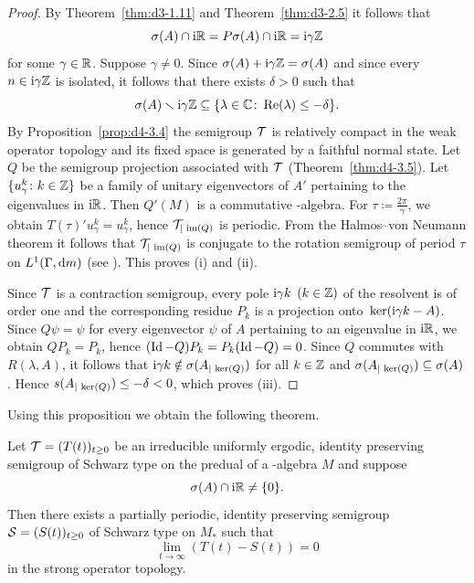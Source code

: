 \begin{proof}
By Theorem~\ref{thm:d3-1.11} and Theorem~\ref{thm:d3-2.5} it follows that
\[
\sigma(A) \cap \mathrm{i}\mathbb{R} = P\sigma(A) \cap \mathrm{i}\mathbb{R} = \mathrm{i}\gamma\mathbb{Z}
\]
for some $ \gamma \in \mathbb{R} $.
Suppose $ \gamma \neq 0 $.
Since $ \sigma(A) + \mathrm{i}\gamma\mathbb{Z} = \sigma(A) $  and since every $ n \in \mathrm{i}\gamma\mathbb{Z} $  is isolated, it follows that there exists $ \delta > 0 $  such that
\[
\sigma(A) \setminus \im\gamma\Z \subseteq \{\lambda \in \C \colon  \Re(\lambda) \leq -\delta\}.
\]
By Proposition~\ref{prop:d4-3.4} the semigroup $ \mathcal{T} $  is relatively compact in the weak operator topology and its fixed space is generated by a faithful normal state.
Let $ Q $  be the semigroup projection associated with $ \mathcal{T} $  (Theorem~\ref{thm:d4-3.5}).
Let $ \{u_{\gamma}^{k} \colon k \in \mathbb{Z}\} $  be a family of unitary eigenvectors of\/ $ A' $  pertaining to the eigenvalues in $ \mathrm{i}\mathbb{R} $.
Then $ Q'(M) $  is a commutative \WA-algebra.
For $ \tau \coloneqq \frac{2\pi}{\gamma} $, we obtain $ T(\tau)'u_{\gamma}^{k} = u_{\gamma}^{k} $, hence $ \mathcal{T}_{\vert \mathop{}\mathrm{im}(Q)} $  is periodic.
From the Halmos--von Neumann theorem it follows that $ \mathcal{T}_{\vert \mathop{}\mathrm{im}(Q)} $  is conjugate to the rotation semigroup of period $ \tau $  on $ L^{1}(\Gamma, \mathop{}\!\mathrm{d}{m}) $ (see \textcite[Theorem III.7.11]{schaefer:1974}).
This proves (i) and (ii).

Since $ \mathcal{T} $  is a contraction semigroup, every pole $ \mathrm{i}\gamma k $  $ (k \in \mathbb{Z}) $  of the resolvent is of order one and the corresponding residue $ P_{k} $  is a projection onto $ \mathop{}\mathrm{ker}(\mathrm{i}\gamma k - A) $.
Since $ Q\psi = \psi $  for every eigenvector $ \psi $  of\/ $ A $  pertaining to an eigenvalue in $ \mathrm{i}\mathbb{R} $, we obtain $ QP_{k} = P_{k} $, hence $ (\operatorname{Id} - Q)P_{k} = P_{k}(\operatorname{Id} - Q) = 0 $.
Since $ Q $  commutes with $ R(\lambda,A) $, it follows that $ \mathrm{i}\gamma k \notin \sigma(A_{\vert \mathop{}\mathrm{ker}(Q)}) $  for all $ k \in \mathbb{Z} $  and $ \sigma(A_{\vert \mathop{}\mathrm{ker}(Q)}) \subseteq \sigma(A) $.
Hence $ s(A_{\vert \Kern{Q}}) \leq -\delta < 0 $, which proves (iii).
\end{proof}
Using this proposition we obtain the following theorem.
\begin{theorem}\label{thm:d4-3.11}
Let $ \TT = (T(t))_{t \geq 0} $  be an irreducible uniformly ergodic, identity preserving semigroup of Schwarz type on the predual of a \WA-algebra $ M $  and suppose 
%
\[
	\sigma(A) \cap \mathrm{i}\mathbb{R} \neq \{0\} .
\]
%
Then there exists a partially periodic, identity preserving semigroup $ \SG = (S(t))_{t \geq 0} $  of Schwarz type on $ M_{*} $  such that
\[
\lim_{t \to \infty} (T(t) - S(t)) = 0
\]
in the strong operator topology.
\end{theorem}
